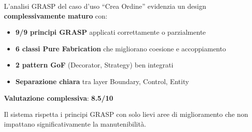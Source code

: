 \documentclass[12pt,a4paper]{article}
\begin{document}
L'analisi GRASP del caso d'uso ``Crea Ordine'' evidenzia un design \textbf{complessivamente maturo} con:

\begin{itemize}
    \item \textbf{9/9 principi GRASP} applicati correttamente o parzialmente
    \item \textbf{6 classi Pure Fabrication} che migliorano coesione e accoppiamento
    \item \textbf{2 pattern GoF} (Decorator, Strategy) ben integrati
    \item \textbf{Separazione chiara} tra layer Boundary, Control, Entity
\end{itemize}

\vspace{0.5cm}

\noindent\textbf{Valutazione complessiva}: \textcolor{okgreen}{\textbf{8.5/10}}

\vspace{0.3cm}

\noindent Il sistema rispetta i principi GRASP con solo lievi aree di miglioramento che non impattano significativamente la manutenibilità.
\end{document}
